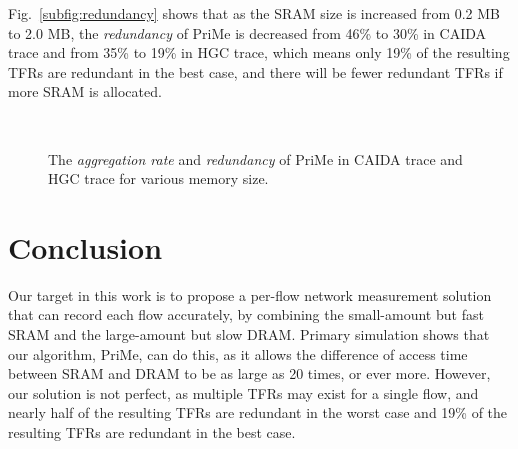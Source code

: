 \documentclass[10pt, conference, letterpaper]{IEEEtran}
\begin{document}
Fig.~\ref{subfig:redundancy} shows that as the SRAM size is increased from 0.2 MB to 2.0 MB, the \emph{redundancy} of PriMe is decreased from 46\% to 30\% in CAIDA trace and from 35\% to 19\% in HGC trace, which means only 19\% of the resulting TFRs are redundant in the best case, and there will be fewer redundant TFRs if more SRAM is allocated.

\begin{figure}[t]
	\centering
	\mbox{
	}
	\caption{The \emph{aggregation rate} and \emph{redundancy} of PriMe in CAIDA trace and HGC trace for various memory size.}
	\label{fig:aggre_rate_accuracy_PriMe_various_memory}
\end{figure} 

\section{Conclusion}
Our target in this work is to propose a per-flow network measurement solution that can record each flow accurately, by combining the small-amount but fast SRAM and the large-amount but slow DRAM. Primary simulation shows that our algorithm, PriMe, can do this, as it allows the difference of access time between SRAM and DRAM to be as large as 20 times, or ever more. However, our solution is not perfect, as multiple TFRs may exist for a single flow, and nearly half of the resulting TFRs are redundant in the worst case and 19\% of the resulting TFRs are redundant in the best case.


\end{document}
